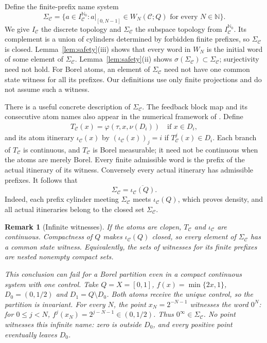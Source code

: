 \documentclass[11pt,reqno]{amsart}
\numberwithin{equation}{section}
\newtheorem{remark}[theorem]{Remark}
\theoremstyle{definition}
\newcommand{\N}{\mathbb N}
\newcommand{\Nzero}{\mathbb N_0}
\newcommand{\C}{\mathcal C}
\begin{document}
Define the finite-prefix name system
\begin{equation}\label{eq:name-system}
 \Sigma_\C=\bigl\{a\in I_\C^{\Nzero}:a|_{[0,N-1]}\in W_N(\C;Q)
 \text{ for every }N\in\N\bigr\}.
\end{equation}
We give $I_\C$ the discrete topology and $\Sigma_\C$ the subspace topology
from $I_\C^{\Nzero}$.  Its complement is a union of cylinders determined by
forbidden finite prefixes, so $\Sigma_\C$ is closed.
Lemma~\ref{lem:safety}(iii) shows that every word in $W_N$ is the initial
word of some element of $\Sigma_\C$.  Lemma~\ref{lem:safety}(ii) shows
$\sigma(\Sigma_\C)\subset\Sigma_\C$; surjectivity need not hold.  For Borel
atoms, an element of $\Sigma_\C$ need not have one common state witness for
all its prefixes.  Our definitions use only finite projections and do not
assume such a witness.

There is a useful concrete description of $\Sigma_\C$. The feedback
block map and its consecutive atom names also appear in the numerical
framework of \cite[Section~2]{TomarKawanZamani2022}. Define
\begin{align*}
 T_\C(x)=\varphi(\tau,x,\nu(D_i))\quad\text{if }x\in D_i,
\end{align*}
and its atom itinerary $\iota_\C(x)$ by
$(\iota_\C(x))_j=i$ if $T_\C^j(x)\in D_i$.
Each branch of $T_\C$ is continuous, and $T_\C$ is Borel measurable;
it need not be continuous when the atoms are merely Borel. Every finite
admissible word is the prefix of the actual itinerary of its witness.
Conversely every actual itinerary has admissible prefixes. It follows that
\begin{equation}\label{eq:itinerary-closure}
 \Sigma_\C=\overline{\iota_\C(Q)}.
\end{equation}
Indeed, each prefix cylinder meeting $\Sigma_\C$ meets
$\iota_\C(Q)$, which proves density, and all actual itineraries belong
to the closed set $\Sigma_\C$.

\begin{remark}[Infinite witnesses]\label{rem:witness}
If the atoms are clopen, $T_\C$ and $\iota_\C$ are continuous.
Compactness of $Q$ makes $\iota_\C(Q)$ closed, so every element of
$\Sigma_\C$ has a common state witness. Equivalently, the sets of witnesses
for its finite prefixes are nested nonempty compact sets.

This conclusion can fail for a Borel partition even in a compact
continuous system with one control. Take $Q=X=[0,1]$,
$f(x)=\min\{2x,1\}$, $D_0=(0,1/2)$ and $D_1=Q\setminus D_0$.
Both atoms receive the unique control, so the partition is invariant.
For every $N$, the point $x_N=2^{-N-1}$ witnesses the word $0^N$:
for $0\le j<N$, $f^j(x_N)=2^{j-N-1}\in(0,1/2)$.
Thus $0^\infty\in\Sigma_\C$. No point witnesses this infinite name:
zero is outside $D_0$, and every positive point eventually leaves $D_0$.
\end{remark}
\end{document}
